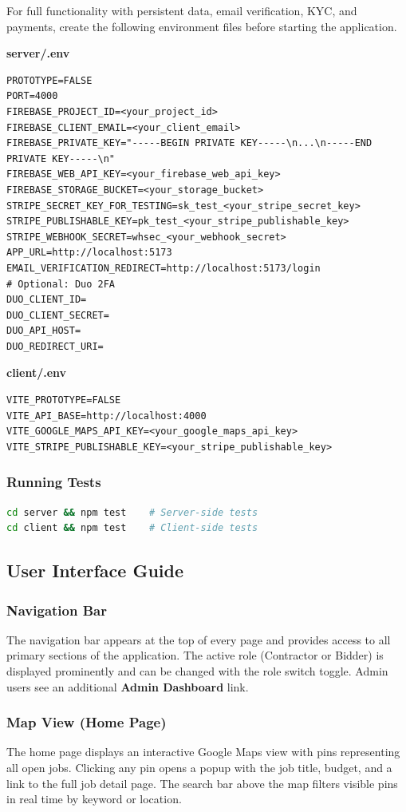 \documentclass[11pt]{article}
\begin{document}
For full functionality with persistent data, email verification, KYC, and payments,
create the following environment files before starting the application.

\textbf{server/.env}
\begin{lstlisting}
PROTOTYPE=FALSE
PORT=4000
FIREBASE_PROJECT_ID=<your_project_id>
FIREBASE_CLIENT_EMAIL=<your_client_email>
FIREBASE_PRIVATE_KEY="-----BEGIN PRIVATE KEY-----\n...\n-----END PRIVATE KEY-----\n"
FIREBASE_WEB_API_KEY=<your_firebase_web_api_key>
FIREBASE_STORAGE_BUCKET=<your_storage_bucket>
STRIPE_SECRET_KEY_FOR_TESTING=sk_test_<your_stripe_secret_key>
STRIPE_PUBLISHABLE_KEY=pk_test_<your_stripe_publishable_key>
STRIPE_WEBHOOK_SECRET=whsec_<your_webhook_secret>
APP_URL=http://localhost:5173
EMAIL_VERIFICATION_REDIRECT=http://localhost:5173/login
# Optional: Duo 2FA
DUO_CLIENT_ID=
DUO_CLIENT_SECRET=
DUO_API_HOST=
DUO_REDIRECT_URI=
\end{lstlisting}

\textbf{client/.env}
\begin{lstlisting}
VITE_PROTOTYPE=FALSE
VITE_API_BASE=http://localhost:4000
VITE_GOOGLE_MAPS_API_KEY=<your_google_maps_api_key>
VITE_STRIPE_PUBLISHABLE_KEY=<your_stripe_publishable_key>
\end{lstlisting}

\subsubsection{Running Tests}
\begin{lstlisting}[language=bash]
cd server && npm test    # Server-side tests
cd client && npm test    # Client-side tests
\end{lstlisting}

\subsection{User Interface Guide}

\subsubsection{Navigation Bar}
The navigation bar appears at the top of every page and provides access to all
primary sections of the application. The active role (Contractor or Bidder) is
displayed prominently and can be changed with the role switch toggle. Admin users
see an additional \textbf{Admin Dashboard} link.

\subsubsection{Map View (Home Page)}
The home page displays an interactive Google Maps view with pins representing all
open jobs. Clicking any pin opens a popup with the job title, budget, and a link to
the full job detail page. The search bar above the map filters visible pins in real
time by keyword or location.
\end{document}
